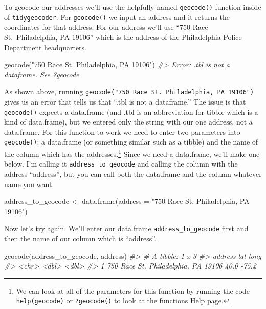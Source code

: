 \documentclass[
]{krantz}
\makeatletter
\newenvironment{Shaded}{\begin{snugshade}}{\end{snugshade}}
\newcommand{\AttributeTok}[1]{\textcolor[rgb]{0.61,0.61,0.61}{#1}}
\newcommand{\CommentTok}[1]{\textcolor[rgb]{0.37,0.37,0.37}{\textit{#1}}}
\newcommand{\FunctionTok}[1]{\textcolor[rgb]{0,0,0}{#1}}
\newcommand{\NormalTok}[1]{#1}
\newcommand{\OtherTok}[1]{\textcolor[rgb]{0.37,0.37,0.37}{#1}}
\newcommand{\StringTok}[1]{\textcolor[rgb]{0.5,0.5,0.5}{#1}}
\newenvironment{kframe}{%
\medskip{}
\setlength{\fboxsep}{.8em}
 \def\at@end@of@kframe{}%
 \ifinner\ifhmode%
  \def\at@end@of@kframe{\end{minipage}}%
  \begin{minipage}{\columnwidth}%
 \fi\fi%
 \def\FrameCommand##1{\hskip\@totalleftmargin \hskip-\fboxsep
 \colorbox{shadecolor}{##1}\hskip-\fboxsep
     \hskip-\linewidth \hskip-\@totalleftmargin \hskip\columnwidth}%
 \MakeFramed {\advance\hsize-\width
   \@totalleftmargin\z@ \linewidth\hsize
   \@setminipage}}%
 {\par\unskip\endMakeFramed%
 \at@end@of@kframe}
\renewenvironment{Shaded}{\begin{kframe}}{\end{kframe}}
\makeatother
\begin{document}
To geocode our addresses we'll use the helpfully named \texttt{geocode()} function inside of \texttt{tidygeocoder}. For \texttt{geocode()} we input an address and it returns the coordinates for that address. For our address we'll use ``750 Race St.~Philadelphia, PA 19106'' which is the address of the Philadelphia Police Department headquarters.

\begin{Shaded}
\begin{Highlighting}[]
\FunctionTok{geocode}\NormalTok{(}\StringTok{"750 Race St. Philadelphia, PA 19106"}\NormalTok{)}
\CommentTok{\#\textgreater{} Error: .tbl is not a dataframe. See ?geocode}
\end{Highlighting}
\end{Shaded}

As shown above, running \texttt{geocode("750\ Race\ St.\ Philadelphia,\ PA\ 19106")} gives us an error that tells us that ``.tbl is not a dataframe.'' The issue is that \texttt{geocode()} expects a data.frame (and .tbl is an abbreviation for tibble which is a kind of data.frame), but we entered only the string with our one address, not a data.frame. For this function to work we need to enter two parameters into \texttt{geocode()}: a data.frame (or something similar such as a tibble) and the name of the column which has the addresses.\footnote{We can look at all of the parameters for this function by running the code \texttt{help(geocode)} or \texttt{?geocode()} to look at the functions Help page.} Since we need a data.frame, we'll make one below. I'm calling it \texttt{address\_to\_geocode} and calling the column with the address ``address'', but you can call both the data.frame and the column whatever name you want.

\begin{Shaded}
\begin{Highlighting}[]
\NormalTok{address\_to\_geocode }\OtherTok{\textless{}{-}} \FunctionTok{data.frame}\NormalTok{(}\AttributeTok{address =} \StringTok{"750 Race St. Philadelphia, PA 19106"}\NormalTok{)}
\end{Highlighting}
\end{Shaded}

Now let's try again. We'll enter our data.frame \texttt{address\_to\_geocode} first and then the name of our column which is ``address''.

\begin{Shaded}
\begin{Highlighting}[]
\FunctionTok{geocode}\NormalTok{(address\_to\_geocode, address)}
\CommentTok{\#\textgreater{} \# A tibble: 1 x 3}
\CommentTok{\#\textgreater{}   address                               lat  long}
\CommentTok{\#\textgreater{}   \textless{}chr\textgreater{}                               \textless{}dbl\textgreater{} \textless{}dbl\textgreater{}}
\CommentTok{\#\textgreater{} 1 750 Race St. Philadelphia, PA 19106  40.0 {-}75.2}
\end{Highlighting}
\end{Shaded}
\end{document}
